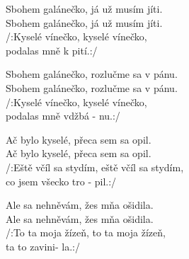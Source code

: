 \ve
{}Sbohem galánečko, já už musím jíti.\\
Sbohem galánečko, já už musím jíti.\\   
/:Kyselé vínečko, kyselé vínečko,\\
podalas mně k  pití.:/

\ve 
Sbohem galánečko, rozlučme sa v pánu. \\
Sbohem galánečko, rozlučme sa v pánu.   \\   
/:Kyselé vínečko, kyselé vínečko,\\
podalas mně vdžbá - nu.:/

\ve
Ač bylo kyselé, přeca sem sa opil.\\
Ač bylo kyselé, přeca sem sa opil.\\
/:Eště včíl sa stydím, eště včíl sa stydím,\\
co jsem všecko tro -  pil.:/

 
\ve
Ale sa nehněvám, žes mňa ošidila. \\
Ale sa nehněvám, žes mňa ošidila.  \\    
/:To ta moja žízeň, to ta moja žízeň,\\
ta to zavini-     la.:/
\esong{}